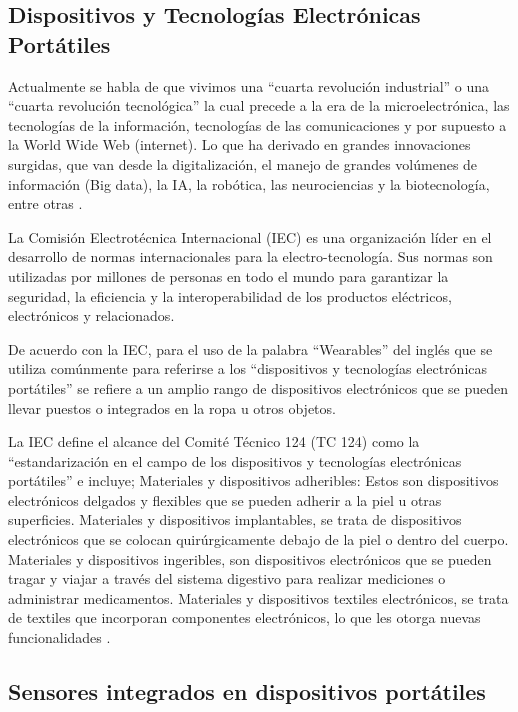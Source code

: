 \subsection{Dispositivos y Tecnologías Electrónicas Portátiles}
\label{subsec:dispositivos_wearables}

Actualmente se habla de que vivimos una ``cuarta revolución industrial'' o una ``cuarta revolución tecnológica'' la cual precede a la era de la microelectrónica, las tecnologías de la información, tecnologías de las comunicaciones y por supuesto a la World Wide Web (internet). Lo que ha derivado en grandes innovaciones surgidas, que van desde la digitalización, el manejo de grandes volúmenes de información (Big data), la IA, la robótica, las neurociencias y la biotecnología, entre otras \citep{Martinez2020Revolucion}.

La Comisión Electrotécnica Internacional (IEC) es una organización líder en el desarrollo de normas internacionales para la electro-tecnología. Sus normas son utilizadas por millones de personas en todo el mundo para garantizar la seguridad, la eficiencia y la interoperabilidad de los productos eléctricos, electrónicos y relacionados.

De acuerdo con la IEC, para el uso de la palabra ``Wearables'' del inglés que se utiliza comúnmente para referirse a los ``dispositivos y tecnologías electrónicas portátiles'' se refiere a un amplio rango de dispositivos electrónicos que se pueden llevar puestos o integrados en la ropa u otros objetos.

La IEC define el alcance del Comité Técnico 124 (TC 124) como la ``estandarización en el campo de los dispositivos y tecnologías electrónicas portátiles'' e incluye; Materiales y dispositivos adheribles: Estos son dispositivos electrónicos delgados y flexibles que se pueden adherir a la piel u otras superficies. Materiales y dispositivos implantables, se trata de dispositivos electrónicos que se colocan quirúrgicamente debajo de la piel o dentro del cuerpo. Materiales y dispositivos ingeribles, son dispositivos electrónicos que se pueden tragar y viajar a través del sistema digestivo para realizar mediciones o administrar medicamentos. Materiales y dispositivos textiles electrónicos, se trata de textiles que incorporan componentes electrónicos, lo que les otorga nuevas funcionalidades \citep{IEC2019Wearables}.

\subsection{Sensores integrados en dispositivos portátiles}
\label{subsec:sensores}

